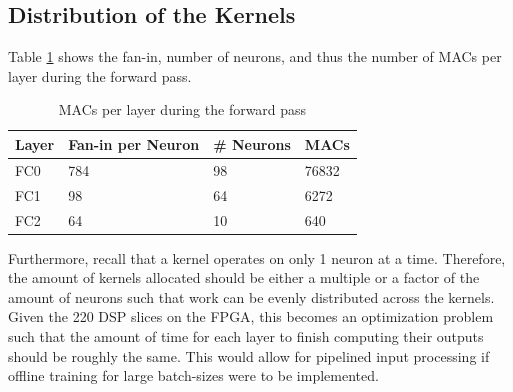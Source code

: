 \subsection{Distribution of the Kernels}
Table \ref{macs-per-layer} shows the fan-in, number of neurons, and thus the number of MACs per layer during the forward pass. 
\begin{table}
	\centering
	\begin{tabular}{|l|l|l|l|}
		\hline
		Layer & Fan-in per Neuron & \# Neurons & MACs \\\hline 
		FC0 & 784  & 98 & 76832 \\\hline 
		FC1 & 98 & 64 & 6272 \\\hline 
		FC2 & 64 & 10 & 640 \\\hline
	\end{tabular}
	\caption{MACs per layer during the forward pass}
	\label{macs-per-layer}
\end{table}

Furthermore, recall that a kernel operates on only 1 neuron at a time. Therefore, the amount of kernels allocated should be either a multiple or a factor of the amount of neurons such that work can be evenly distributed across the kernels. Given the 220 DSP slices on the FPGA, this becomes an optimization problem such that the amount of time for each layer to finish computing their outputs should be roughly the same. This would allow for pipelined input processing if offline training for large batch-sizes were to be implemented.

